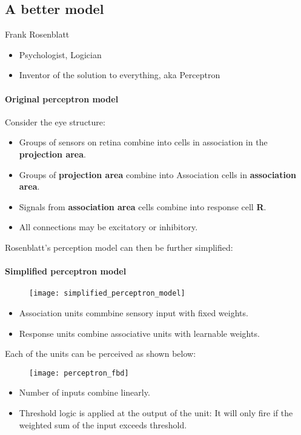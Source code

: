 \subsection{A better model}
Frank Rosenblatt
\begin{itemize}
	\item Psychologist, Logician
	\item Inventor of the solution to everything, aka Perceptron
\end{itemize}

\paragraph{Original perceptron model}
Consider the eye structure:
\begin{itemize}
	\item Groups of sensors on retina combine into cells in association in the \textbf{projection area}.
	\item Groups of \textbf{projection area} combine into Association cells in \textbf{association area}.
	\item Signals from \textbf{association area} cells combine into response cell \textbf{R}.
	\item All connections may be excitatory or inhibitory.
\end{itemize}

Rosenblatt's perception model can then be further simplified:
\paragraph{Simplified perceptron model}

\begin{figure}[h]
	\centering
	\texttt{[image: simplified\_perceptron\_model]}
\end{figure}

\begin{itemize}
	\item Association units commbine sensory input with fixed weights.
	\item Response units combine associative units with learnable weights.
\end{itemize}

Each of the units can be perceived as shown below:
\begin{figure}[h]
	\centering
	\texttt{[image: perceptron\_fbd]}
\end{figure}

\begin{itemize}
	\item Number of inputs combine linearly.
	\item Threshold logic is applied at the output of the unit: It will only fire if the weighted sum of the input exceeds threshold.
\end{itemize}

